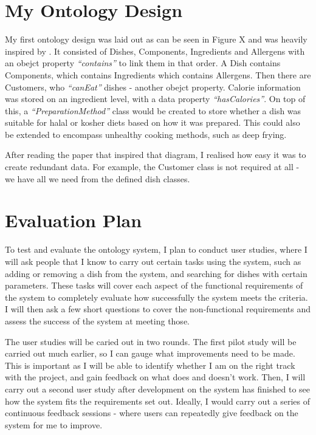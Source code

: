 \section{My Ontology Design}

My first ontology design was laid out as can be seen in Figure X and was heavily inspired by \cite{ontology_pitfalls}. It consisted of Dishes, Components, Ingredients and Allergens with an obejct property \textit{``contains''} to link them in that order. A Dish contains Components, which contains Ingredients which contains Allergens. Then there are Customers, who \textit{``canEat''} dishes - another obejct property. Calorie information was stored on an ingredient level, with a data property \textit{``hasCalories''}. On top of this, a \textit{``PreparationMethod''} class would be created to store whether a dish was suitable for halal or kosher diets based on how it was prepared. This could also be extended to encompass unhealthy cooking methods, such as deep frying.

After reading the paper that inspired that diagram\cite{ontology_pitfalls}, I realised how easy it was to create redundant data. For example, the Customer class is not required at all - we have all we need from the defined dish classes.

\section{Evaluation Plan}

To test and evaluate the ontology system, I plan to conduct user studies, where I will ask people that I know to carry out certain tasks using the system, such as adding or removing a dish from the system, and searching for dishes with certain parameters. These tasks will cover each aspect of the functional requirements of the system to completely evaluate how successfully the system meets the criteria. I will then ask a few short questions to cover the non-functional requirements and assess the success of the system at meeting those.

The user studies will be caried out in two rounds. The first pilot study will be carried out much earlier, so I can gauge what improvements need to be made. This is important as I will be able to identify whether I am on the right track with the project, and gain feedback on what does and doesn't work. Then, I will carry out a second user study after development on the system has finished to see how the system fits the requirements set out. Ideally, I would carry out a series of continuous feedback sessions - where users can repeatedly give feedback on the system for me to improve.

